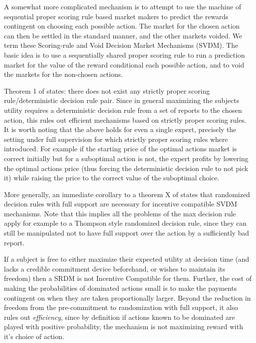 
A somewhat more complicated mechanism is to attempt to use the machine of sequential proper scoring rule based market makers to predict the rewards contingent on choosing each possible action. The market for the chosen action can then be settled in the standard manner, and the other markets voided. 
We term these Scoring-rule and Void Decision Market Mechanisms (SVDM). The basic idea is to use a sequentially shared proper scoring rule to run a prediction market for the value of the reward conditional each possible action, and to void the markets for the non-chosen actions.  

Theorem 1 of \cite{othman2010decision} states: there does not exist any strictly proper scoring rule/deterministic decision rule pair.
Since in general maximizing the subjects utility requires a deterministic decision rule from a set of reports to the chosen action, this rules out efficient mechanisms based on strictly proper scoring rules. 
It is worth noting that the above holds for even a single expert, precisely the setting under full supervision for which strictly proper scoring rules where introduced. 
For example if the starting price of the optimal actions market is correct initially but for a suboptimal action is not, the expert profits by lowering the optimal actions price (thus forcing the deterministic decision rule to not pick it) while raising the price to the correct value of the suboptimal choice. 

More generally, an immediate corollary to a theorem X of \cite{chen2014eliciting} states that randomized decision rules with full support are necessary for incentive compatible SVDM mechanisms.
Note that this implies all the problems of the max decision rule apply for example to a Thompson style randomized decision rule, since they can still be manipulated not to have full support over the action by a sufficiently bad report.

If a subject is free to either maximize their expected utility at decision time (and lacks a credible commitment device beforehand, or wishes to maintain its freedom) then a SRDM is not Incentive Compatible for them. Further, the cost of making the probabilities of dominated actions small is to make the payments contingent on when they are taken proportionally larger.
Beyond the reduction in freedom from the pre-commitment to randomization with full support, it also rules out \emph{efficiency}, since by definition if actions known to be dominated are played with positive probability, the mechanism is not maximizing reward with it's choice of action.
 
